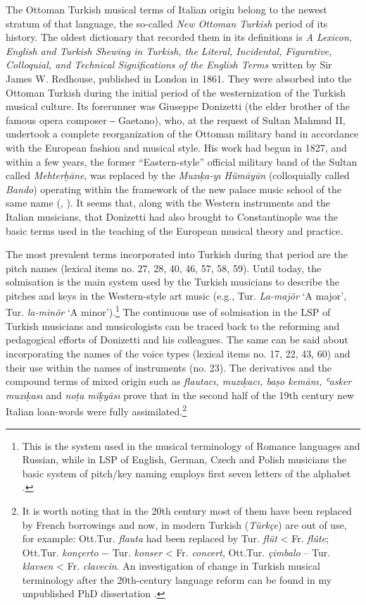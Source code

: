 \documentclass[output=paper,colorlinks,citecolor=brown,arabicfont,chinesefont]{langscibook}
\begin{document}
The Ottoman Turkish musical terms of  Italian origin belong to the newest stratum of that language, the so-called \emph{New Ottoman Turkish} period of its history. The oldest dictionary that recorded them in its definitions is \emph{A Lexicon, English and Turkish Shewing in Turkish, the Literal, Incidental, Figurative, Colloquial, and Technical Significations of the English Terms} written by Sir James W. Redhouse, published in London in 1861. They were absorbed into the Ottoman Turkish during the initial period of the westernization of the Turkish musical culture. Its forerunner was Giuseppe Donizetti (the elder brother of the famous opera composer ‒ Gaetano), who, at the request of Sultan Mahmud II, undertook a complete reorganization of the Ottoman military band in accordance with the European fashion and musical style. His work had begun in 1827, and within a few years, the former “Eastern-style” official military band of the Sultan called \emph{Mehterḫāne}, was replaced by the \emph{Muzıḳa-yı Hümāyūn} (colloquially called \emph{Bando}) operating within the framework of the new palace music school of the same name (\citealt{Araci2002,Araci2006, KomsuogluTuran2007, Pawlina2014}, \citealt[278--95]{Sanal1964, Yore2011}). It seems that, along with the Western instruments and the Italian musicians, that Donizetti had also brought to Constantinople was the basic terms used in the teaching of the European musical theory and practice.

The most prevalent terms incorporated into Turkish during that period are the pitch names (lexical items no. 27, 28, 40, 46, 57, 58, 59). Until today, the solmisation is the main system used by the Turkish musicians to describe the pitches and keys in the Western-style art music (e.g., Tur. \emph{La-majör} ‘A major’, Tur. \emph{la-minör} ‘A minor’).\footnote{This is the system used in the musical terminology of Romance languages and Russian, while in LSP of English, German, Czech and Polish musicians the basic system of pitch/key naming employs first seven letters of the alphabet \citep[82]{Dabkowski1997}.} The continuous use of solmisation in the LSP of Turkish musicians and musicologists can be traced back to the reforming and pedagogical efforts of Donizetti and his colleagues. The same can be said about incorporating the names of the voice types (lexical items no. 17, 22, 43, 60) and their use within the names of instruments (no. 23). The derivatives and the compound terms of mixed origin such as \emph{flautacı, muzıḳacı, baṣo kemānı, ʿasker muzıḳası} and \emph{noṭa miḳyāsı} prove that in the second half of the 19th century new Italian loan-words were fully assimilated.\footnote{It is worth noting that in the 20th century most of them have been replaced by French borrowings and now, in modern Turkish (\emph{Türkçe}) are out of use, for example: Ott.Tur. \emph{flauta} had been replaced by Tur. \emph{flüt} < Fr. \emph{flûte}; Ott.Tur. \emph{konçerto} − Tur. \emph{konser} < Fr. \emph{concert}, Ott.Tur. \emph{çimbalo} – Tur. \emph{klavsen} < Fr. \emph{clavecin}. An investigation of change in Turkish musical terminology after the 20th-century language reform can be found in my unpublished PhD dissertation \citep{Pawlina2021}.}
\end{document}

